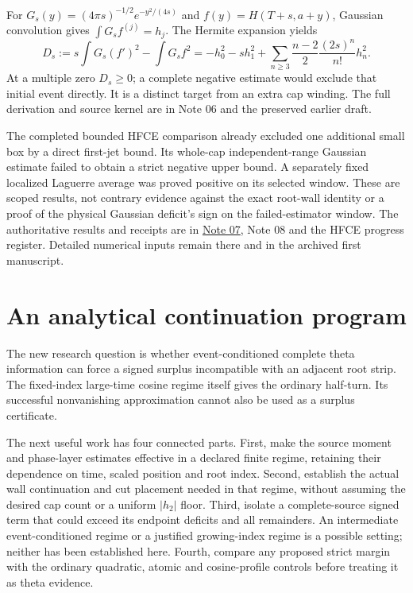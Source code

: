 \documentclass[11pt]{article}
\theoremstyle{definition}
\begin{document}
For \(G_s(y)=(4\pi s)^{-1/2}e^{-y^2/(4s)}\) and
\(f(y)=H(T+s,a+y)\), Gaussian convolution gives
\(\int G_s f^{(j)}=h_j\). The Hermite expansion yields
\[
 D_s:=s\int G_s(f')^2-\int G_s f^2
 =-h_0^2-sh_1^2+
 \sum_{n\ge3}\frac{n-2}{2}\frac{(2s)^n}{n!}h_n^2.
\]
At a multiple zero \(D_s\ge0\); a complete negative estimate would
exclude that initial event directly. It is a distinct target from an
extra cap winding. The full derivation and source kernel are in Note 06
and the preserved earlier draft.

The completed bounded HFCE comparison already excluded one additional
small box by a direct first-jet bound. Its whole-cap independent-range
Gaussian estimate failed to obtain a strict negative upper bound.
A separately fixed localized Laguerre average was proved positive on
its selected window. These are scoped results, not contrary evidence
against the exact root-wall identity or a proof of the physical
Gaussian deficit's sign on the failed-estimator window.
The authoritative results and receipts are in
\href{../notes/07_FIXED_GAUSSIAN_COMPARISON_20261020.md}{Note 07},
Note 08 and the HFCE progress register. Detailed numerical inputs
remain there and in the archived first manuscript.

\section{An analytical continuation program}
\label{sec:program}
The new research question is whether event-conditioned complete theta
information can force a signed surplus incompatible with an adjacent
root strip. The fixed-index large-time cosine regime itself gives the
ordinary half-turn. Its successful nonvanishing approximation cannot
also be used as a surplus certificate.

The next useful work has four connected parts.
First, make the source moment and phase-layer estimates effective in a
declared finite regime, retaining their dependence on time, scaled
position and root index. Second, establish the actual wall continuation
and cut placement needed in that regime, without assuming the desired
cap count or a uniform \(|h_2|\) floor. Third, isolate a complete-source
signed term that could exceed its endpoint deficits and all remainders.
An intermediate event-conditioned regime or a justified growing-index
regime is a possible setting; neither has been established here.
Fourth, compare any proposed strict margin with the ordinary quadratic,
atomic and cosine-profile controls before treating it as theta evidence.
\end{document}
